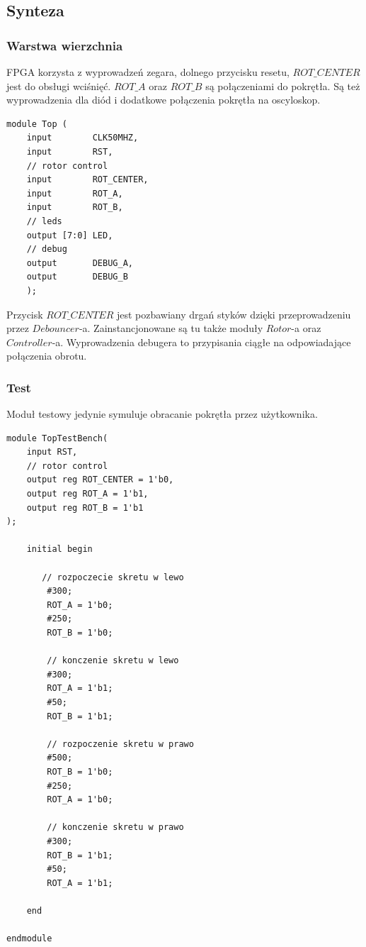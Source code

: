 \documentclass[a4paper,12pt]{article}
\begin{document}
\subsection{Synteza}

\subsubsection{Warstwa wierzchnia}

FPGA korzysta z wyprowadzeń zegara, dolnego przycisku resetu, $ROT\_CENTER$ jest do obsługi wciśnięć. $ROT\_A$ oraz $ROT\_B$ są połączeniami do pokrętła. Są też wyprowadzenia dla diód i dodatkowe połączenia pokrętła na oscyloskop.
\begin{lstlisting}[label=Rs232Tx,caption=Rs232Tx.v,firstnumber=14]
module Top (
    input        CLK50MHZ,
    input        RST,
    // rotor control
    input        ROT_CENTER,
    input        ROT_A,
    input        ROT_B,
    // leds
    output [7:0] LED,
    // debug
    output       DEBUG_A,
    output       DEBUG_B
    );
\end{lstlisting}
Przycisk $ROT\_CENTER$ jest pozbawiany drgań styków dzięki przeprowadzeniu przez $Debouncer$-a. Zainstancjonowane są tu także moduły $Rotor$-a oraz $Controller$-a. Wyprowadzenia debugera to przypisania ciągłe na odpowiadające połączenia obrotu.

\subsubsection{Test}
Moduł testowy jedynie symuluje obracanie pokrętła przez użytkownika.
\begin{lstlisting}[label=TopTestBench,caption=TopTestBench.v]
module TopTestBench(
    input RST,
    // rotor control
    output reg ROT_CENTER = 1'b0,
    output reg ROT_A = 1'b1,
    output reg ROT_B = 1'b1
);

    initial begin

       // rozpoczecie skretu w lewo
        #300;
        ROT_A = 1'b0;
        #250;
        ROT_B = 1'b0;

        // konczenie skretu w lewo
        #300;
        ROT_A = 1'b1;
        #50;
        ROT_B = 1'b1;

        // rozpoczenie skretu w prawo
        #500;
        ROT_B = 1'b0;
        #250;
        ROT_A = 1'b0;

        // konczenie skretu w prawo
        #300;
        ROT_B = 1'b1;
        #50;
        ROT_A = 1'b1;

    end

endmodule
\end{lstlisting}
\end{document}
